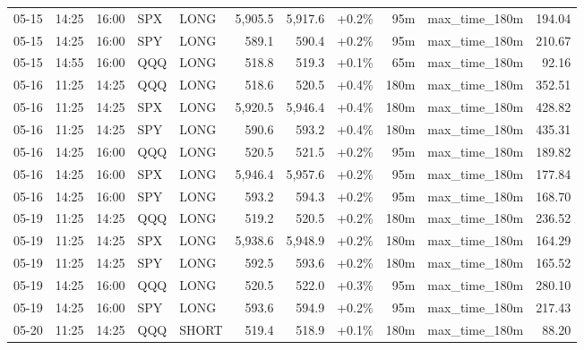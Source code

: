 \documentclass[11pt,a4paper,twoside]{article}
\begin{document}
\begin{center}
\begin{longtable}{>{\color{txtmain}}l l l l l r r r r >{\color{txtmain}}l r}
05-15 & 14:25 & 16:00 & SPX & LONG & 5,905.5 & 5,917.6 & \textcolor{wingreen}{+0.2\%} & 95m & max\_time\_180m & \textcolor{wingreen}{194.04} \\
05-15 & 14:25 & 16:00 & SPY & LONG & 589.1 & 590.4 & \textcolor{wingreen}{+0.2\%} & 95m & max\_time\_180m & \textcolor{wingreen}{210.67} \\
05-15 & 14:55 & 16:00 & QQQ & LONG & 518.8 & 519.3 & \textcolor{wingreen}{+0.1\%} & 65m & max\_time\_180m & \textcolor{wingreen}{92.16} \\
05-16 & 11:25 & 14:25 & QQQ & LONG & 518.6 & 520.5 & \textcolor{wingreen}{+0.4\%} & 180m & max\_time\_180m & \textcolor{wingreen}{352.51} \\
05-16 & 11:25 & 14:25 & SPX & LONG & 5,920.5 & 5,946.4 & \textcolor{wingreen}{+0.4\%} & 180m & max\_time\_180m & \textcolor{wingreen}{428.82} \\
05-16 & 11:25 & 14:25 & SPY & LONG & 590.6 & 593.2 & \textcolor{wingreen}{+0.4\%} & 180m & max\_time\_180m & \textcolor{wingreen}{435.31} \\
05-16 & 14:25 & 16:00 & QQQ & LONG & 520.5 & 521.5 & \textcolor{wingreen}{+0.2\%} & 95m & max\_time\_180m & \textcolor{wingreen}{189.82} \\
05-16 & 14:25 & 16:00 & SPX & LONG & 5,946.4 & 5,957.6 & \textcolor{wingreen}{+0.2\%} & 95m & max\_time\_180m & \textcolor{wingreen}{177.84} \\
05-16 & 14:25 & 16:00 & SPY & LONG & 593.2 & 594.3 & \textcolor{wingreen}{+0.2\%} & 95m & max\_time\_180m & \textcolor{wingreen}{168.70} \\
05-19 & 11:25 & 14:25 & QQQ & LONG & 519.2 & 520.5 & \textcolor{wingreen}{+0.2\%} & 180m & max\_time\_180m & \textcolor{wingreen}{236.52} \\
05-19 & 11:25 & 14:25 & SPX & LONG & 5,938.6 & 5,948.9 & \textcolor{wingreen}{+0.2\%} & 180m & max\_time\_180m & \textcolor{wingreen}{164.29} \\
05-19 & 11:25 & 14:25 & SPY & LONG & 592.5 & 593.6 & \textcolor{wingreen}{+0.2\%} & 180m & max\_time\_180m & \textcolor{wingreen}{165.52} \\
05-19 & 14:25 & 16:00 & QQQ & LONG & 520.5 & 522.0 & \textcolor{wingreen}{+0.3\%} & 95m & max\_time\_180m & \textcolor{wingreen}{280.10} \\
05-19 & 14:25 & 16:00 & SPY & LONG & 593.6 & 594.9 & \textcolor{wingreen}{+0.2\%} & 95m & max\_time\_180m & \textcolor{wingreen}{217.43} \\
05-20 & 11:25 & 14:25 & QQQ & SHORT & 519.4 & 518.9 & \textcolor{wingreen}{+0.1\%} & 180m & max\_time\_180m & \textcolor{wingreen}{88.20} \\

\end{longtable}
\end{center}
\end{document}
